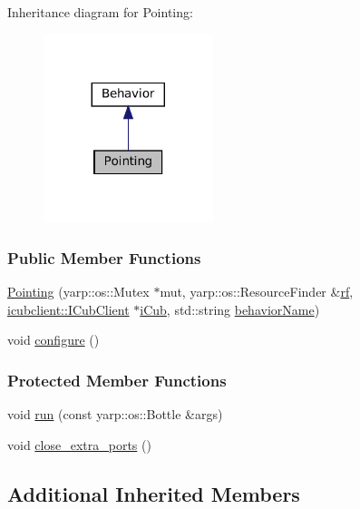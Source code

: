 Inheritance diagram for Pointing\+:
\nopagebreak
\begin{figure}[H]
\begin{center}
\leavevmode
\includegraphics[width=140pt]{classPointing__inherit__graph}
\end{center}
\end{figure}
\subsubsection*{Public Member Functions}
\begin{DoxyCompactItemize}
\item 
\hyperlink{group__behaviorManager_a9c8ff6e312704973cd3fac5b955bf613}{Pointing} (yarp\+::os\+::\+Mutex $\ast$mut, yarp\+::os\+::\+Resource\+Finder \&\hyperlink{group__behaviorManager_a789254580a094846e91a9892fa2bc4cd}{rf}, \hyperlink{group__icubclient__clients_classicubclient_1_1ICubClient}{icubclient\+::\+I\+Cub\+Client} $\ast$\hyperlink{group__behaviorManager_a5ab3f49bb3a40d79fe2b4aeb76e12196}{i\+Cub}, std\+::string \hyperlink{group__behaviorManager_aad9d5bf2f1f1e9c6902a4f40b03c4e67}{behavior\+Name})
\item 
void \hyperlink{group__behaviorManager_a1681f79ff201a977a2d9124026d6cac8}{configure} ()
\end{DoxyCompactItemize}
\subsubsection*{Protected Member Functions}
\begin{DoxyCompactItemize}
\item 
void \hyperlink{group__behaviorManager_a6f1a7b52f3c846009e6b510dbb728011}{run} (const yarp\+::os\+::\+Bottle \&args)
\item 
void \hyperlink{group__behaviorManager_a28ede20962e35d2ec2680f66ba371a0f}{close\+\_\+extra\+\_\+ports} ()
\end{DoxyCompactItemize}
\subsection*{Additional Inherited Members}


